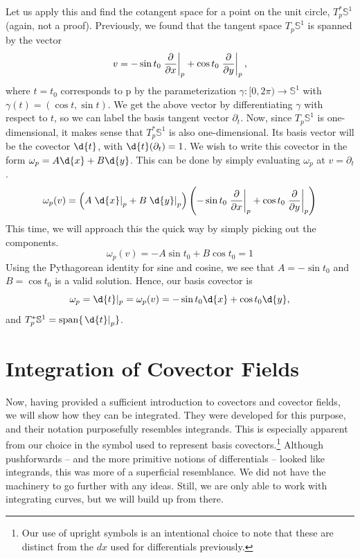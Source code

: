 \documentclass[a4paper,12pt]{article}
\begin{document}
Let us apply this and find the cotangent space for a point on the unit circle, $T^*_p \mathbb{S}^1$ (again, not a proof).
Previously, we found that the tangent space $T_p \mathbb{S}^1$ is spanned by the vector
\begin{equation*}
    v = - \sin t_0 \eval{\frac{\partial}{\partial x}}{p} + \cos t_0 \eval{\frac{\partial}{\partial y}}{p},
\end{equation*}
where $t=t_0$ corresponds to p by the parameterization $\gamma \colon [0, 2\pi) \to \mathbb{S}^1$ with $\gamma(t) = (\cos t, \sin t)$.
We get the above vector by differentiating $\gamma$ with respect to $t$, so we can label the basis tangent vector $\partial_t$.
Now, since $T_p \mathbb{S}^1$ is one-dimensional, it makes sense that $T^*_p \mathbb{S}^1$ is also one-dimensional.
Its basis vector will be the covector $\d{t}$, with $\d{t}(\partial_t) = 1$.
We wish to write this covector in the form $\omega_p = A \d{x} + B \d{y}$.
This can be done by simply evaluating $\omega_p$ at $v = \partial_t$.
\begin{equation*}
    \omega_p(v) = \left( A \eval{\d{x}}{p} + B \eval{\d{y}}{p} \right) \left( - \sin t_0 \eval{\frac{\partial}{\partial x}}{p} + \cos t_0 \eval{\frac{\partial}{\partial y}}{p} \right)
\end{equation*}
This time, we will approach this the quick way by simply picking out the components.
\begin{equation*}
    \omega_p(v) = - A \sin t_0 + B \cos t_0 = 1
\end{equation*}
Using the Pythagorean identity for sine and cosine, we see that $A = - \sin t_0$ and $B = \cos t_0$ is a valid solution.
Hence, our basis covector is
\begin{equation*}
    \omega_p = \eval*{\d{t}}{p} = \omega_p(v) = - \sin t_0 \d{x} + \cos t_0 \d{y},
\end{equation*}
and $T^*_p \mathbb{S}^1 = \operatorname{span}\{\eval{\d{t}}{p} \}$.

\section{Integration of Covector Fields}

Now, having provided a sufficient introduction to covectors and covector fields, we will show how they can be integrated.
They were developed for this purpose, and their notation purposefully resembles integrands.
This is especially apparent from our choice in the symbol used to represent basis covectors.\footnote{Our use of upright symbols is an intentional choice to note that these are distinct from the $dx$ used for differentials previously.}
Although pushforwards -- and the more primitive notions of differentials -- looked like integrands, this was more of a superficial resemblance.
We did not have the machinery to go further with any ideas.
Still, we are only able to work with integrating curves, but we will build up from there.
\end{document}
